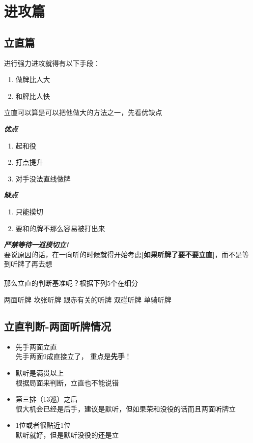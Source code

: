 \documentclass[小V的日麻笔记.tex]{subfiles}
\begin{document}
\chapter{进攻篇}
\section{立直篇}

进行强力进攻就得有以下手段：
\begin{enumerate}
\item 做牌比人大
\item 和牌比人快
\end{enumerate}

立直可以算是可以把他做大的方法之一，先看优缺点

\textbf{\emph{优点}}
\begin{enumerate}
\item 起和役
\item 打点提升
\item 对手没法直线做牌
\end{enumerate}

\textbf{\emph{缺点}}
\begin{enumerate}
\item 只能摸切
\item 要和的牌不那么容易被打出来
\end{enumerate}

\textbf{\emph{严禁等待一巡摸切立!}}
\\
要说原因的话，在一向听的时候就得开始考虑\textbf{[如果听牌了要不要立直]}，而不是等到听牌了再去想
\\
\\
那么立直的判断基准呢？根据下列5个在细分
\begin{description}
\arrowitem 两面听牌
\arrowitem 坎张听牌
\arrowitem 跟赤有关的听牌
\arrowitem 双碰听牌
\arrowitem 单骑听牌
\end{description}

\section{立直判断-两面听牌情况}
\begin{itemize}
\item 先手两面立直
\\
先手两面9成直接立了， 重点是\textbf{先手}！
\\
\item 默听是满贯以上
\\
根据局面来判断，立直也不能说错
\\
\item 第三排（13巡）之后
\\
很大机会已经是后手，建议是默听，但如果荣和没役的话而且两面听牌立
\\
\item 1位或者很贴近1位
\\
默听就好，但是默听没役的还是立
\end{itemize}
\end{document}
